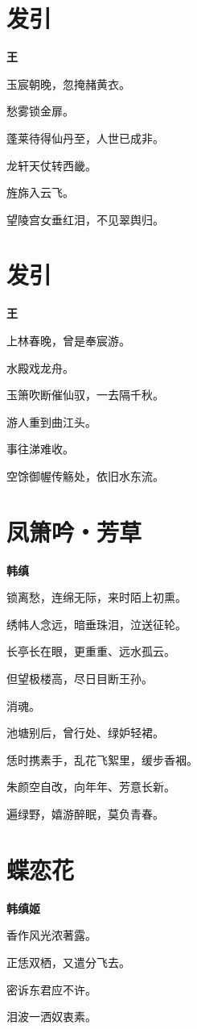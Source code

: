 \documentclass[12pt,a4paper]{ctexbook}
\begin{document}
\section{发引}
\textbf{王}\par\vspace{0.5em}
玉宸朝晚，忽掩赭黄衣。\par
愁雾锁金扉。\par
蓬莱待得仙丹至，人世已成非。\par
龙轩天仗转西畿。\par
旌旆入云飞。\par
望陵宫女垂红泪，不见翠舆归。\par

\section{发引}
\textbf{王}\par\vspace{0.5em}
上林春晚，曾是奉宸游。\par
水殿戏龙舟。\par
玉箫吹断催仙驭，一去隔千秋。\par
游人重到曲江头。\par
事往涕难收。\par
空馀御幄传觞处，依旧水东流。\par

\section{凤箫吟・芳草}
\textbf{韩缜}\par\vspace{0.5em}
锁离愁，连绵无际，来时陌上初熏。\par
绣帏人念远，暗垂珠泪，泣送征轮。\par
长亭长在眼，更重重、远水孤云。\par
但望极楼高，尽日目断王孙。\par
消魂。\par
池塘别后，曾行处、绿妒轻裙。\par
恁时携素手，乱花飞絮里，缓步香裀。\par
朱颜空自改，向年年、芳意长新。\par
遍绿野，嬉游醉眠，莫负青春。\par

\section{蝶恋花}
\textbf{韩缜姬}\par\vspace{0.5em}
香作风光浓著露。\par
正恁双栖，又遣分飞去。\par
密诉东君应不许。\par
泪波一洒奴衷素。\par
\end{document}
